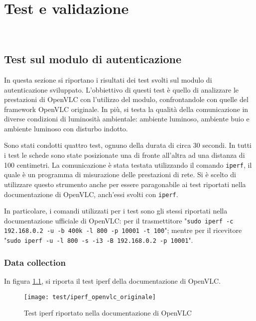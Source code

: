 \chapter{Test e validazione}
\label{cap:test}

\\

\section{Test sul modulo di autenticazione}
In questa sezione si riportano i risultati dei test svolti sul modulo di autenticazione sviluppato. L'obbiettivo di questi test è quello di analizzare le prestazioni di OpenVLC con l'utilizzo del modulo, confrontandole con quelle del framework OpenVLC originale. In più, si testa la qualità della comunicazione in diverse condizioni di luminosità ambientale: ambiente luminoso, ambiente buio e ambiente luminoso con disturbo indotto.

Sono stati condotti quattro test, ognuno della durata di circa 30 secondi. In tutti i test le schede sono state posizionate una di fronte all'altra ad una distanza di 100 centimetri. La comunicazione è stata testata utilizzando il comando \texttt{iperf}, il quale è un programma di misurazione delle prestazioni di rete. Si è scelto di utilizzare questo strumento anche per essere paragonabile ai test riportati nella documentazione di OpenVLC, anch'essi svolti con \texttt{iperf}.

In particolare, i comandi utilizzati per i test sono gli stessi riportati nella documentazione ufficiale di OpenVLC: per il trasmettitore "\texttt{sudo iperf -c 192.168.0.2 -u -b 400k -l 800 -p 10001 -t 100}"; mentre per il ricevitore "\texttt{sudo iperf -u -l 800 -s -i3 -B 192.168.0.2 -p 10001}".

\subsection{Data collection}

In figura \ref{fig:iperf_openvlc_originale}, si riporta il test iperf della documentazione di OpenVLC.
\begin{figure}[H] 
    \centering 
    \texttt{[image: test/iperf\_openvlc\_originale]} 
    \caption{Test iperf riportato nella documentazione di OpenVLC}
    \label{fig:iperf_openvlc_originale}
\end{figure}

